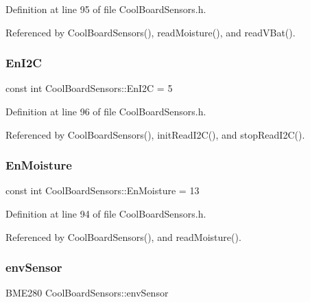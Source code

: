 Definition at line 95 of file Cool\+Board\+Sensors.\+h.



Referenced by Cool\+Board\+Sensors(), read\+Moisture(), and read\+V\+Bat().

\mbox{\label{classCoolBoardSensors_aaa6b5dbf3a6633bffd9d204d961096dc}} 
\subsubsection{\texorpdfstring{En\+I2C}{EnI2C}}
{\footnotesize\ttfamily const int Cool\+Board\+Sensors\+::\+En\+I2C = 5\hspace{0.3cm}{\ttfamily [private]}}



Definition at line 96 of file Cool\+Board\+Sensors.\+h.



Referenced by Cool\+Board\+Sensors(), init\+Read\+I2\+C(), and stop\+Read\+I2\+C().

\mbox{\label{classCoolBoardSensors_a6177d02e14a057a2f171a2e930b5038d}} 
\subsubsection{\texorpdfstring{En\+Moisture}{EnMoisture}}
{\footnotesize\ttfamily const int Cool\+Board\+Sensors\+::\+En\+Moisture = 13\hspace{0.3cm}{\ttfamily [private]}}



Definition at line 94 of file Cool\+Board\+Sensors.\+h.



Referenced by Cool\+Board\+Sensors(), and read\+Moisture().

\mbox{\label{classCoolBoardSensors_a868e38985e9a2412829fa2790ca13e2e}} 
\subsubsection{\texorpdfstring{env\+Sensor}{envSensor}}
{\footnotesize\ttfamily B\+M\+E280 Cool\+Board\+Sensors\+::env\+Sensor}



